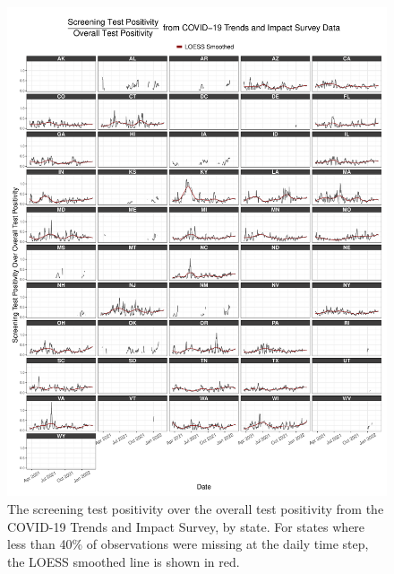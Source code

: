 \documentclass[12pt,twoside]{smiththesis}
\begin{document}
\vspace{5 cm}
\begin{figure}
\includegraphics[width=1\linewidth]{figure/ctis_beta_states} \caption{\label{fig:statectis}The screening test positivity over the overall test positivity from the COVID-19 Trends and Impact Survey, by state. For states where less than 40\% of observations were missing at the daily time step, the LOESS smoothed line is shown in red.}\label{fig:unnamed-chunk-60}
\end{figure}
\end{document}
